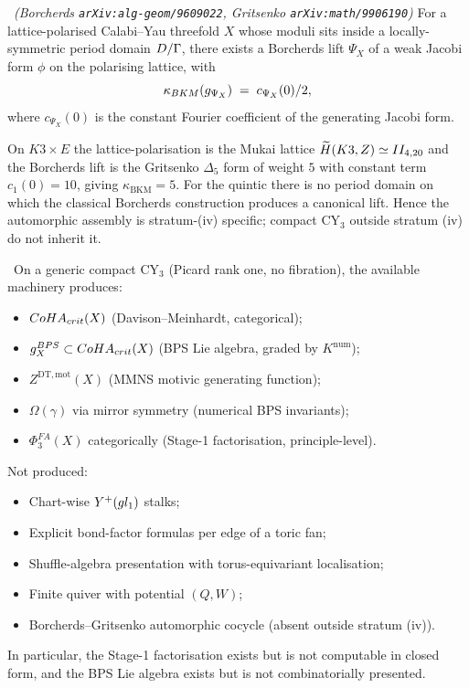 \begin{proposition}
\label{prop:borcherds-assembly}
\ClaimStatusProvedElsewhere\
\emph{(Borcherds \texttt{arXiv:alg-geom/9609022},
Gritsenko \texttt{arXiv:math/9906190})}
For a lattice-polarised Calabi--Yau threefold $X$ whose moduli sits
inside a locally-symmetric period domain $D / \Gamma$, there exists
a Borcherds lift $\Psi_X$ of a weak Jacobi form $\phi$ on the
polarising lattice, with
\[
  \kappa_{BKM}(g_{\Psi_X}) \;=\; c_{\Psi_X}(0)/2,
\]
where $c_{\Psi_X}(0)$ is the constant Fourier coefficient of the
generating Jacobi form.
\end{proposition}

On $K3 \times E$ the lattice-polarisation is the Mukai lattice
$\widetilde H(K3, Z) \simeq II_{4,20}$ and the Borcherds
lift is the Gritsenko $\Delta_5$ form of weight $5$ with constant term
$c_1(0) = 10$, giving $\kappa_{\mathrm{BKM}} = 5$. For the quintic
there is no period domain on which the classical Borcherds construction
produces a canonical lift. Hence the automorphic assembly is
stratum-(iv) specific; compact CY$_3$ outside stratum (iv) do not inherit
it.

\begin{theorem}
\label{thm:recovery-summary}
\ClaimStatusProposition\
On a generic compact CY$_3$ (Picard rank one, no fibration), the
available machinery produces:
\begin{itemize}[leftmargin=2em]
\item $CoHA_{crit}(X)$ (Davison--Meinhardt, categorical);
\item $g_X^{BPS} \subset CoHA_{crit}(X)$ (BPS Lie
  algebra, graded by $K^{\mathrm{num}}$);
\item $Z^{\mathrm{DT,mot}}(X)$ (MMNS motivic generating function);
\item $\Omega(\gamma)$ via mirror symmetry (numerical BPS invariants);
\item $\Phi^{FA}_3(X)$ categorically (Stage-1 factorisation, principle-level).
\end{itemize}
Not produced:
\begin{itemize}[leftmargin=2em]
\item Chart-wise $Y^+(gl_1)$ stalks;
\item Explicit bond-factor formulas per edge of a toric fan;
\item Shuffle-algebra presentation with torus-equivariant localisation;
\item Finite quiver with potential $(Q, W)$;
\item Borcherds--Gritsenko automorphic cocycle (absent outside stratum
  (iv)).
\end{itemize}
In particular, the Stage-1 factorisation exists but is not computable in
closed form, and the BPS Lie algebra exists but is not combinatorially
presented.
\end{theorem}

